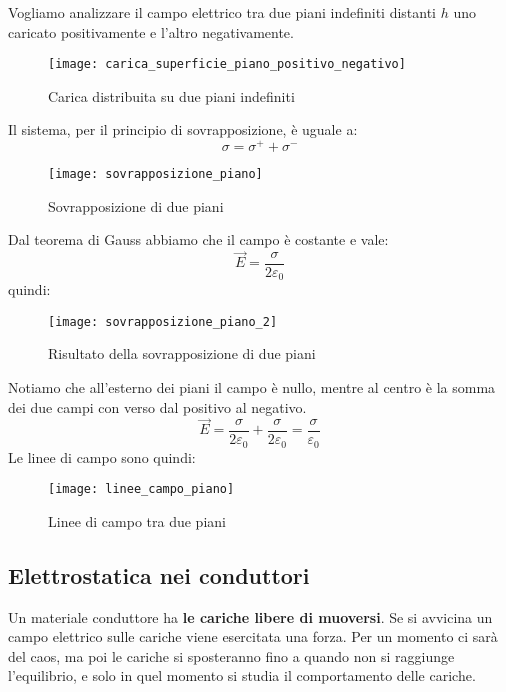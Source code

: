 \documentclass[a4paper]{article}
\begin{document}
\begin{example}
  Vogliamo analizzare il campo elettrico tra due piani indefiniti distanti \( h \) uno
  caricato positivamente e l'altro negativamente.
  \begin{figure}[H]
    \centering
    \texttt{[image: carica\_superficie\_piano\_positivo\_negativo]}
    \caption{Carica distribuita su due piani indefiniti}
  \end{figure}
  \noindent
  Il sistema, per il principio di sovrapposizione, è uguale a:
  \[
    \sigma = \sigma ^+ + \sigma ^-
  \] 
  \begin{figure}[H]
    \centering
    \texttt{[image: sovrapposizione\_piano]}
    \caption{Sovrapposizione di due piani}
  \end{figure}
  \noindent
  Dal teorema di Gauss abbiamo che il campo è costante e vale:
  \[
    \vec{E} = \frac{\sigma}{2 \varepsilon_0}
  \] 
  quindi:
  \begin{figure}[H]
    \centering
    \texttt{[image: sovrapposizione\_piano\_2]}
    \caption{Risultato della sovrapposizione di due piani}
  \end{figure}
  \noindent
  Notiamo che all'esterno dei piani il campo è nullo, mentre al centro è la somma
  dei due campi con verso dal positivo al negativo.
  \[
    \vec{E} = \frac{\sigma}{2\varepsilon_0} + \frac{\sigma}{2\varepsilon_0} =
    \frac{\sigma}{\varepsilon_0}
  \] 
  Le linee di campo sono quindi:
  \begin{figure}[H]
    \centering
    \texttt{[image: linee\_campo\_piano]}
    \caption{Linee di campo tra due piani}
  \end{figure}
\end{example}

\subsection{Elettrostatica nei conduttori}
Un materiale conduttore ha \textbf{le cariche libere di muoversi}. Se si avvicina un
campo elettrico sulle cariche viene esercitata una forza. Per un momento ci sarà
del caos, ma poi le cariche si sposteranno fino a quando non si raggiunge l'equilibrio,
e solo in quel momento si studia il comportamento delle cariche.
\end{document}
